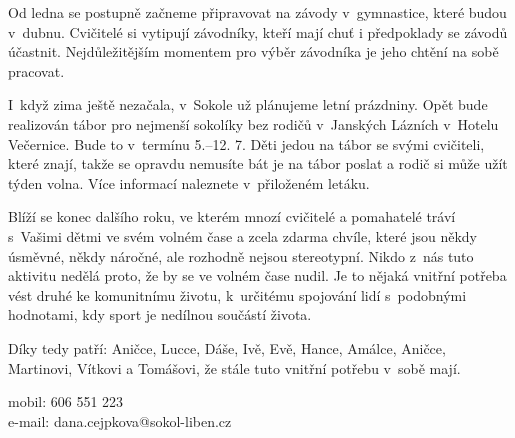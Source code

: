\documentclass[11pt]{article}
\begin{document}
Od ledna se postupně začneme připravovat na závody v~gymnastice, které budou v~dubnu. Cvičitelé si vytipují závodníky, kteří mají chuť i předpoklady se závodů účastnit. Nejdůležitějším momentem pro výběr závodníka je jeho chtění na sobě pracovat.

\clearpage
{}
I~když zima ještě nezačala, v~Sokole už plánujeme letní prázdniny. Opět bude realizován tábor pro nejmenší sokolíky bez rodičů v~Janských Lázních v~Hotelu Večernice. Bude to v~termínu 5.–12. 7. Děti jedou na tábor se svými cvičiteli, které znají, takže se opravdu nemusíte bát je na tábor poslat a rodič si může užít týden volna. Více informací naleznete v~přiloženém letáku.

Blíží se konec dalšího roku, ve kterém mnozí cvičitelé a pomahatelé tráví s~Vašimi dětmi ve svém volném čase a zcela zdarma chvíle, které jsou někdy úsměvné, někdy náročné, ale rozhodně nejsou stereotypní. Nikdo z~nás tuto aktivitu nedělá proto, že by se ve volném čase nudil. Je to nějaká vnitřní potřeba vést druhé ke komunitnímu životu, k~určitému spojování lidí s~podobnými hodnotami, kdy sport je nedílnou součástí života.

Díky tedy patří: Aničce, Lucce, Dáše, Ivě, Evě, Hance, Amálce, Aničce, Martinovi, Vítkovi a Tomášovi, že stále tuto vnitřní potřebu v~sobě mají.

\signature{Dana Cejpková}{mobil: 606 551 223\\e-mail: dana.cejpkova@sokol-liben.cz}


\clearpage
\end{document}
